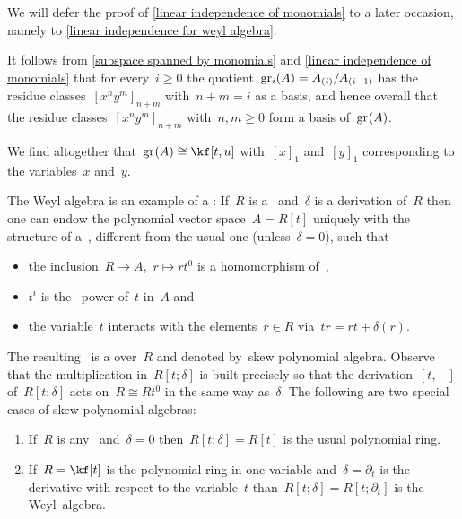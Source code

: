 \begin{example}
  We will defer the proof of \cref{linear independence of monomials} to a later occasion, namely to \cref{linear independence for weyl algebra}.
  
  It follows from \cref{subspace spanned by monomials} and \cref{linear independence of monomials} that for every~$i \geq 0$ the quotient~$\gr[i](A) = A_{(i)} / A_{(i-1)}$ has the residue classes~$[x^n y^m]_{n+m}$ with~$n+m = i$ as a basis, and hence overall that the residue classes~$[x^n y^m]_{n+m}$ with~$n, m \geq 0$ form a basis of~$\gr(A)$.
  
  We find altogether that~$\gr(A) \cong \kf[t,u]$ with~$[x]_1$ and~$[y]_1$ corresponding to the variables~$x$ and~$y$.
\end{example}


\begin{remark}
  The Weyl algebra is an example of a :
  If~$R$ is a~{\algebra{$\kf$}} and~$\delta$ is a derivation of~$R$ then one can endow the polynomial vector space~$A = R[t]$ uniquely with the structure of a~{\algebra{$\kf$}}, different from the usual one (unless~$\delta = 0$), such that
  \begin{itemize}
    \item
      the inclusion~$R \to A$,~$r \mapsto r t^0$ is a homomorphism of~{\algebras{$\kf$}},
    \item
      $t^i$ is the~{} power of~$t$ in~$A$ and
    \item
      the variable~$t$ interacts with the elements~$r \in R$ via~$t r = r t + \delta(r)$.
  \end{itemize}
  The resulting~{\algebra{$\kf$}} is a  over~$R$ and denoted by~\gls*{skew polynomial algebra}.
  Observe that the multiplication in~$R[t;\delta]$ is built precisely so that the derivation~$[t,-]$ of~$R[t;\delta]$ acts on~$R \cong R t^0$ in the same way as~$\delta$.
  The following are two special cases of skew polynomial algebras:
  \begin{enumerate}
    \item
      If~$R$ is any~{\algebra{$\kf$}} and~$\delta = 0$ then~$R[t; \delta] = R[t]$ is the usual polynomial ring.
    \item
      If~$R = \kf[t]$ is the polynomial ring in one variable and~$\delta = \partial_t$ is the derivative with respect to the variable~$t$ than~$R[t;\delta] = R[t;\partial_t]$ is the Weyl~algebra.
  \end{enumerate}

\end{remark}
